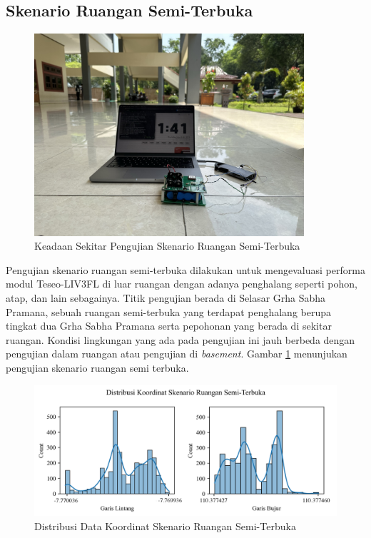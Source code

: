 \subsection{Skenario Ruangan Semi-Terbuka}
\begin{figure}[H]
	\centering
	\includegraphics[width=10cm]{contents/chapter-4/3-skenario-semioutdoor/keadaan.jpeg}
	\caption{Keadaan Sekitar Pengujian Skenario Ruangan Semi-Terbuka}
	\label{Fig: semioutdoor-keadaan}
\end{figure}

Pengujian skenario ruangan semi-terbuka dilakukan untuk mengevaluasi performa modul Teseo-LIV3FL di luar ruangan dengan adanya penghalang seperti pohon, atap, dan lain sebagainya. Titik pengujian berada di Selasar Grha Sabha Pramana, sebuah ruangan semi-terbuka yang terdapat penghalang berupa tingkat dua Grha Sabha Pramana serta pepohonan yang berada di sekitar ruangan. Kondisi lingkungan yang ada pada pengujian ini jauh berbeda dengan pengujian dalam ruangan atau pengujian di \textit{basement}. Gambar \ref{Fig: semioutdoor-keadaan} menunjukan pengujian skenario ruangan semi terbuka.

\begin{figure}[H]
	\centering
	\begin{adjustbox}{width=\textwidth}
		\includegraphics{contents/chapter-4/3-skenario-semioutdoor/distribution.png}
	\end{adjustbox}
	\caption{Distribusi Data Koordinat Skenario Ruangan Semi-Terbuka}
	\label{Fig:semioutdoor-distribution}
\end{figure}

